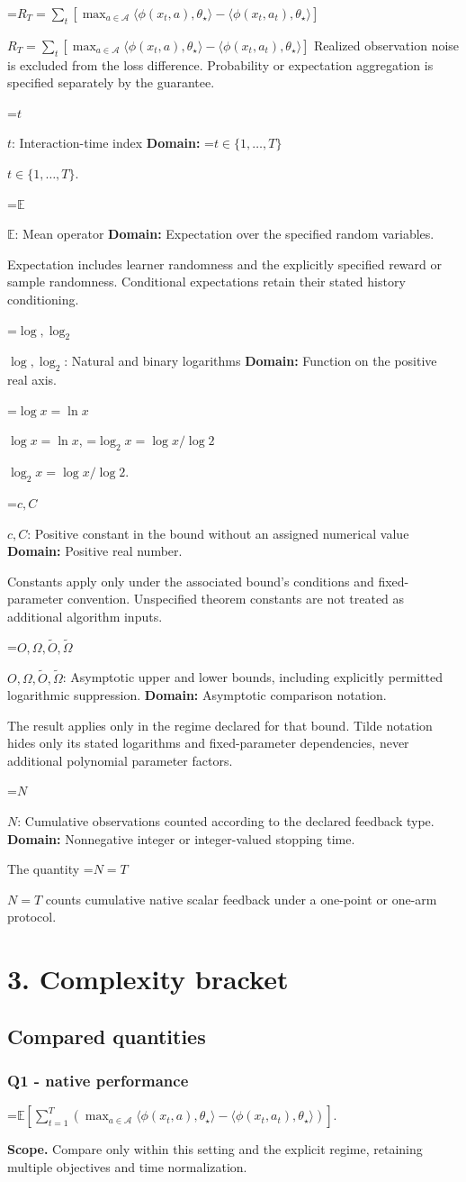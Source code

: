 \documentclass[10pt,a4paper]{article}
\newcommand{\AtlasMath}[1]{\par\begingroup\centering\setbox0=\hbox{$\displaystyle #1$}\ifdim\wd0>1.4\linewidth\typeout{ATLAS WIDE FORMULA: \the\wd0}\fi\ifdim\wd0>\linewidth\resizebox{\linewidth}{!}{\box0}\else\box0\fi\par\endgroup}
\newcommand{\AtlasInlineMath}[1]{\begingroup\setbox0=\hbox{$#1$}\ifdim\wd0>.4\linewidth\endgroup\AtlasMath{#1}\else\endgroup$#1$\fi}
\begin{document}
\AtlasInlineMath{R_T=\sum_t[\max_{a\in\mathcal A}\langle\phi(x_t,a),\theta_\star\rangle-\langle\phi(x_t,a_t),\theta_\star\rangle]} Realized observation noise is excluded from the loss difference. Probability or expectation aggregation is specified separately by the guarantee.

\AtlasInlineMath{t}: Interaction-time index \textbf{Domain:} \AtlasInlineMath{t\in\{1,\ldots,T\}}.

\AtlasInlineMath{\mathbb E}: Mean operator \textbf{Domain:} Expectation over the specified random variables.

Expectation includes learner randomness and the explicitly specified reward or sample randomness. Conditional expectations retain their stated history conditioning.

\AtlasInlineMath{\log,\log_2}: Natural and binary logarithms \textbf{Domain:} Function on the positive real axis.

\AtlasInlineMath{\log x=\ln x}, \AtlasInlineMath{\log_2x=\log x/\log2}.

\AtlasInlineMath{c,C}: Positive constant in the bound without an assigned numerical value \textbf{Domain:} Positive real number.

Constants apply only under the associated bound’s conditions and fixed-parameter convention. Unspecified theorem constants are not treated as additional algorithm inputs.

\AtlasInlineMath{O,\Omega,\widetilde O,\widetilde\Omega}: Asymptotic upper and lower bounds, including explicitly permitted logarithmic suppression. \textbf{Domain:} Asymptotic comparison notation.

The result applies only in the regime declared for that bound. Tilde notation hides only its stated logarithms and fixed-parameter dependencies, never additional polynomial parameter factors.

\AtlasInlineMath{N}: Cumulative observations counted according to the declared feedback type. \textbf{Domain:} Nonnegative integer or integer-valued stopping time.

The quantity \AtlasInlineMath{N=T} counts cumulative native scalar feedback under a one-point or one-arm protocol.

\section{3. Complexity bracket}
\subsection{Compared quantities}
\subsubsection{Q1 - native performance}
\AtlasMath{\mathbb E\!\left[\sum_{t=1}^{T}\left(\max_{a\in\mathcal A}\langle\phi(x_t,a),\theta_\star\rangle-\langle\phi(x_t,a_t),\theta_\star\rangle\right)\right].}
\textbf{Scope.} Compare only within this setting and the explicit regime, retaining multiple objectives and time normalization.
\end{document}
